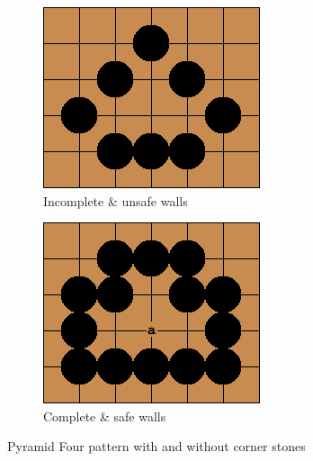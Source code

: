 \documentclass{l4proj}
\begin{document}
\begin{figure}[!ht]
\centering
\begin{subfigure}[b]{0.45\textwidth}
\centering
\includegraphics[width=\textwidth]{pat/2a.png}
\caption{Incomplete \& unsafe walls}
\label{fig:pat-2a}
\end{subfigure}
\begin{subfigure}[b]{0.45\textwidth}
\centering
\includegraphics[width=\textwidth]{pat/2b.png}
\caption{Complete \& safe walls}
\label{fig:pat-2b}
\end{subfigure}
\caption{Pyramid Four pattern with and without corner stones}
\label{fig:pat-2}
\end{figure}
\end{document}
